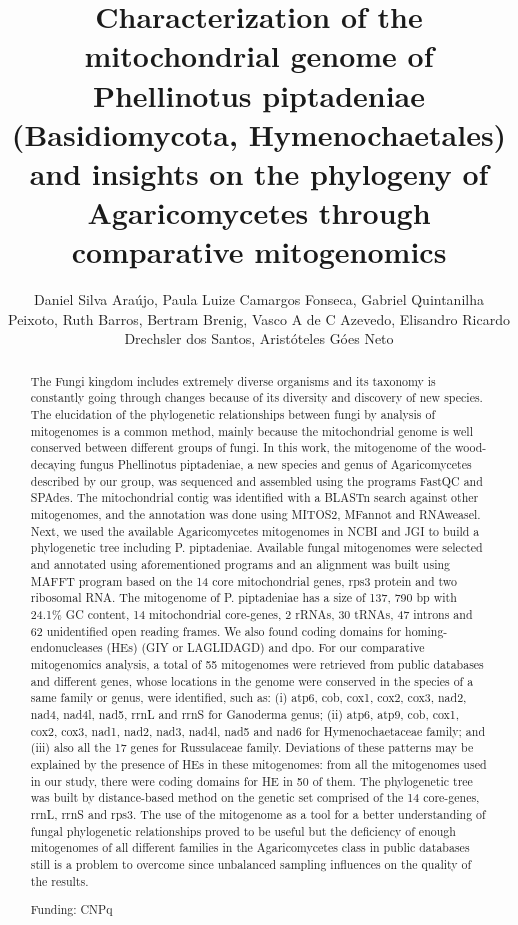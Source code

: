 \documentclass[twoside]{article}
\title{\vspace{-15mm}\fontsize{24pt}{10pt}\selectfont\textbf{ Characterization of the mitochondrial genome of Phellinotus piptadeniae (Basidiomycota,  Hymenochaetales) and insights on the phylogeny of Agaricomycetes through comparative mitogenomics }} %
\author{ Daniel Silva Ara\'ujo, Paula Luize Camargos Fonseca, Gabriel Quintanilha Peixoto, Ruth Barros, Bertram Brenig, Vasco A de C Azevedo, Elisandro Ricardo Drechsler dos Santos, Arist\'oteles G\'oes Neto }
\affil{ University G\"ottingen }
\date{}
\begin{document}
  
  
  \maketitle %
  
  
  \thispagestyle{fancy} %
  
  
  \begin{abstract}
  The Fungi kingdom includes extremely diverse organisms and its taxonomy is constantly going through changes because of its diversity and discovery of new species. The elucidation of the phylogenetic relationships between fungi by analysis of mitogenomes is a common method,  mainly because the mitochondrial genome is well conserved between different groups of fungi. In this work,  the mitogenome of the wood-decaying fungus Phellinotus piptadeniae,  a new species and genus of Agaricomycetes described by our group,  was sequenced and assembled using the programs FastQC and SPAdes. The mitochondrial contig was identified with a BLASTn search against other mitogenomes,  and the annotation was done using MITOS2,  MFannot and RNAweasel. Next,  we used the available Agaricomycetes mitogenomes in NCBI and JGI to build a phylogenetic tree including P. piptadeniae. Available fungal mitogenomes were selected and annotated using aforementioned programs and an alignment was built using MAFFT program based on the 14 core mitochondrial genes,  rps3 protein and two ribosomal RNA. The mitogenome of P. piptadeniae has a size of 137, 790 bp with 24.1\% GC content,  14 mitochondrial core-genes,  2 rRNAs,  30 tRNAs,  47 introns and 62 unidentified open reading frames. We also found coding domains for homing-endonucleases (HEs) (GIY or LAGLIDAGD) and dpo. For our comparative mitogenomics analysis,  a total of 55 mitogenomes were retrieved from public databases and different genes,  whose locations in the genome were conserved in the species of a same family or genus,  were identified,  such as: (i) atp6,  cob,  cox1,  cox2,  cox3,  nad2,  nad4,  nad4l,  nad5,  rrnL and rrnS for Ganoderma genus; (ii) atp6,  atp9,  cob,  cox1,  cox2,  cox3,  nad1,  nad2,  nad3,  nad4l,  nad5 and nad6 for Hymenochaetaceae family; and (iii) also all the 17 genes for Russulaceae family. Deviations of these patterns may be explained by the presence of HEs in these mitogenomes: from all the mitogenomes used in our study,  there were coding domains for HE in 50 of them. The phylogenetic tree was built by distance-based method on the genetic set comprised of the 14 core-genes,  rrnL,  rrnS and rps3. The use of the mitogenome as a tool for a better understanding of fungal phylogenetic relationships proved to be useful but the deficiency of enough mitogenomes of all different families in the Agaricomycetes class in public databases still is a problem to overcome since unbalanced sampling influences on the quality of the results.
  
  Funding: CNPq \\ 
  \end{abstract}
  
\end{document}
